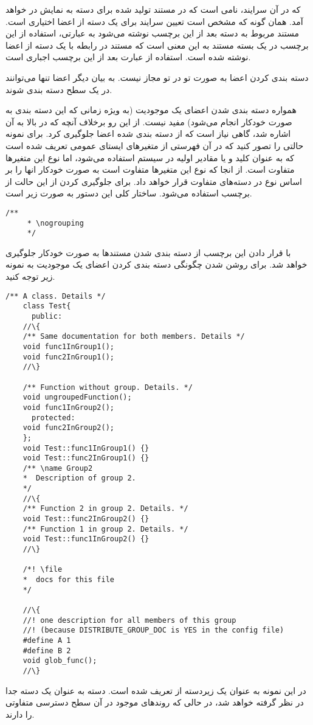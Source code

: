 که در آن سرایند، نامی است که در مستند تولید شده برای دسته به نمایش در خواهد آمد.
همان گونه که مشخص است تعیین سرایند برای یک دسته از اعضا اختیاری است. مستند مربوط
به دسته بعد از این برچسب نوشته می‌شود به عبارتی، استفاده از این برچسب در یک بسته
مستند به این معنی است که مستند در رابطه با یک دسته از اعضا نوشته شده است.
استفاده از عبارت \lr{ \\{ \\}} بعد از این برچسب اجباری است.

\begin{note}
دسته بندی کردن اعضا به صورت تو در تو مجاز نیست. به بیان دیگر اعضا تنها می‌توانند
در یک سطح دسته بندی شوند.
\end{note}

همواره دسته بندی شدن اعضای یک موجودیت (به ویژه زمانی که این دسته بندی به صورت
خودکار انجام می‌شود) مفید نیست. از این رو برخلاف آنچه که در بالا به آن اشاره شد،
گاهی نیاز است که از دسته بندی شده اعضا جلوگیری کرد. برای نمونه حالتی را تصور
کنید که در آن فهرستی از متغیرهای ایستای عمومی تعریف شده است که
به عنوان کلید و یا مقادیر اولیه در سیستم استفاده می‌شود، اما نوع این متغیرها
متفاوت است. از انجا که نوع این متغیرها متفاوت است  به صورت خودکار
انها را بر اساس نوع در دسته‌های متفاوت قرار خواهد داد. برای جلوگیری کردن از این
حالت از برچسب  استفاده می‌شود. ساختار کلی این دستور به صورت زیر
است.

\begin{latin}
\lstset{language=C++}  
\begin{lstlisting}[frame=single] 
    /**
     * \nogrouping
     */
\end{lstlisting}
\end{latin}

با قرار دادن این برچسب از دسته بندی شدن مستندها به صورت خودکار جلوگیری خواهد شد.
برای روشن شدن چگونگی دسته بندی کردن اعضای یک موجودیت به نمونه زیر توجه کنید.

\begin{latin}
\lstset{language=C++}  
\begin{lstlisting}[frame=single] 
    /** A class. Details */
    class Test{
      public:
	//\{
	/** Same documentation for both members. Details */
	void func1InGroup1();
	void func2InGroup1();
	//\}

	/** Function without group. Details. */
	void ungroupedFunction();
	void func1InGroup2();
      protected:
	void func2InGroup2();
    };
    void Test::func1InGroup1() {}
    void Test::func2InGroup1() {}
    /** \name Group2
    *  Description of group 2. 
    */
    //\{
    /** Function 2 in group 2. Details. */
    void Test::func2InGroup2() {}
    /** Function 1 in group 2. Details. */
    void Test::func1InGroup2() {}
    //\}

    /*! \file 
    *  docs for this file
    */

    //\{
    //! one description for all members of this group 
    //! (because DISTRIBUTE_GROUP_DOC is YES in the config file)
    #define A 1
    #define B 2
    void glob_func();
    //\}
\end{lstlisting}
\end{latin}
در این نمونه  به عنوان یک زیردسته از  تعریف شده است. دسته  
به عنوان یک دسته جدا در نظر گرفته خواهد شد، در حالی که روندهای موجود در آن سطح دسترسی متفاوتی را دارند.
